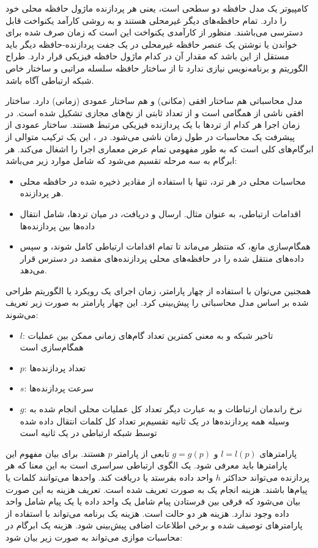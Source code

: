 کامپیوتر  یک مدل حافظه دو سطحی است، یعنی هر پردازنده ماژول حافظه محلی خود را دارد. تمام حافظه‌های دیگر غیرمحلی هستند و به روشی کارآمد یکنواخت قابل دسترسی می‌باشند. منظور از کارآمدی یکنواخت این است که زمان صرف شده برای خواندن یا نوشتن یک عنصر حافظه غیرمحلی در یک جفت  پردازنده-حافظه دیگر باید مستقل از این باشد که مقدار آن در کدام ماژول حافظه فیزیکی قرار دارد. طراح الگوریتم و برنامه‌نویس نیازی ندارد تا از ساختار حافظه سلسله مراتبی و ساختار خاص شبکه ارتباطی آگاه باشد.

مدل محاسباتی  هم ساختار افقی (مکانی) و هم ساختار عمودی (زمانی) دارد. ساختار افقی ناشی از همگامی است و از تعداد ثابتی از نخ‌های مجازی تشکیل شده است. در زمان اجرا هر کدام از تردها با یک پردازنده فیزیکی مرتبط هستند. ساختار عمودی از پیشرفت یک محاسبات در طول زمان ناشی می‌شود. در ، این یک ترکیب متوالی از ابرگام‌های کلی است که به طور مفهومی تمام عرض معماری اجرا را اشغال می‌کند. هر ابرگام به سه مرحله تقسیم می‌شود که شامل موارد زیر می‌باشد:
\begin{itemize}
	\item محاسبات محلی در هر ترد، تنها با استفاده از مقادیر ذخیره شده در حافظه محلی هر پردازنده.
	\item اقدامات ارتباطی، به عنوان مثال. ارسال و دریافت، در میان تردها، شامل انتقال داده‌ها بین پردازنده‌ها
	\item همگام‌سازی مانع، که منتظر می‌ماند تا تمام اقدامات ارتباطی کامل شوند، و سپس داده‌های منتقل شده را در حافظه‌های محلی پردازنده‌های مقصد در دسترس قرار می‌دهد.
\end{itemize}
همجنین می‌توان با استفاده از چهار پارامتر، زمان اجرای یک رویکرد یا الگوریتم طراحی شده بر اساس مدل محاسباتی  را پیش‌بینی کرد. این چهار پارامتر به صورت زیر تعریف می‌شوند:
\begin{itemize}
	\item $l$: تاخیر شبکه و به معنی کمترین تعداد گام‌های زمانی ممکن بین عملیات همگام‌سازی است
	\item  $p$: تعداد پردازنده‌ها
	\item $s$: سرعت پردازنده‌ها
	\item $g$: نرخ راندمان ارتباطات و به عبارت دیگر تعداد کل عملیات محلی انجام شده به وسیله همه پردازنده‌ها در یک ثانیه تقسیم‌بر تعداد کل کلمات انتقال داده شده توسط شبکه ارتباطی در یک ثانیه است
\end{itemize}

پارامترهای $l=l(p)$ و $g=g(p)$ تابعی از پارامتر $p$ هستند. برای بیان مفهوم این پارامترها باید  معرفی شود.  یک الگوی ارتباطی سراسری است به این معنا که هر پردازنده می‌تواند حداکثر $h$ واحد داده بفرستد یا دریافت کند. واحدها می‌توانند کلمات یا پیام‌ها باشند. هزینه انجام یک  به صورت  تعریف شده است. تعریف هزینه به این صورت بیان می‌شود که فرقی بین فرستادن  پیام شامل یک واحد داده یا یک پیام شامل  واحد داده وجود ندارد. هزینه هر دو حالت  است. هزینه یک برنامه  می‌تواند با استفاده از پارامترهای توصیف‌ شده و برخی اطلاعات اضافی پیش‌بینی شود. هزینه یک ابرگام در محاسبات موازی می‌تواند به صورت زیر بیان شود:


